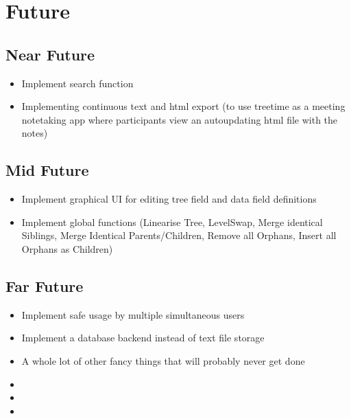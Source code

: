 \documentclass[letterpaper,10pt,english]{sphinxmanual}
\begin{document}
\section{Future}
\label{\detokenize{releases:future}}

\subsection{Near Future}
\label{\detokenize{releases:near-future}}\begin{itemize}
\item {} 
\sphinxAtStartPar
Implement search function

\item {} 
\sphinxAtStartPar
Implementing continuous text and html export (to use treetime as a meeting note\sphinxhyphen{}taking app where participants view an auto\sphinxhyphen{}updating html file with the notes)

\end{itemize}


\subsection{Mid Future}
\label{\detokenize{releases:mid-future}}\begin{itemize}
\item {} 
\sphinxAtStartPar
Implement graphical UI for editing tree field and data field definitions

\item {} 
\sphinxAtStartPar
Implement global functions (Linearise Tree, Level\sphinxhyphen{}Swap, Merge identical Siblings, Merge Identical Parents/Children, Remove all Orphans, Insert all Orphans as Children)

\end{itemize}


\subsection{Far Future}
\label{\detokenize{releases:far-future}}\begin{itemize}
\item {} 
\sphinxAtStartPar
Implement safe usage by multiple simultaneous users

\item {} 
\sphinxAtStartPar
Implement a database backend instead of text file storage

\item {} 
\sphinxAtStartPar
A whole lot of other fancy things that will probably never get done

\end{itemize}
\begin{itemize}
\item {} 
\sphinxAtStartPar
{}

\item {} 
\sphinxAtStartPar
{}

\item {} 
\sphinxAtStartPar
{}

\end{itemize}



\renewcommand{\indexname}{Index}
\printindex
\end{document}
